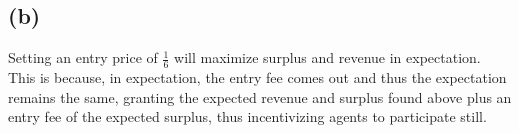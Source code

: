 \documentclass[10pt,a4paper]{article}
\begin{document}
  \subsection{(b)}
    Setting an entry price of $\frac{1}{6}$ will maximize surplus and revenue in expectation. This is because, in expectation, the entry fee comes out and thus the expectation remains the same, granting the expected revenue and surplus found above plus an entry fee of the expected surplus, thus incentivizing agents to participate still.
\end{document}
